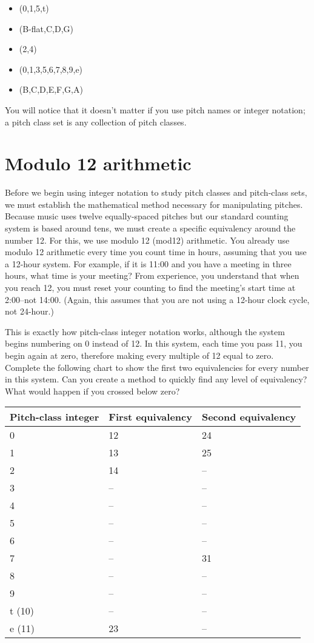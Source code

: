 \documentclass{book}
\providecommand{\tightlist}{%
  \setlength{\itemsep}{0pt}\setlength{\parskip}{0pt}}
\begin{document}
\begin{itemize}
\tightlist
\item
  (0,1,5,t)
\item
  (B-flat,C,D,G)
\item
  (2,4)
\item
  (0,1,3,5,6,7,8,9,e)
\item
  (B,C,D,E,F,G,A)
\end{itemize}

You will notice that it doesn't matter if you use pitch names or integer
notation; a pitch class set is any collection of pitch classes.

\hypertarget{modulo-12-arithmetic}{%
\section{Modulo 12 arithmetic}\label{modulo-12-arithmetic}}

Before we begin using integer notation to study pitch classes and pitch-class
sets, we must establish the mathematical method necessary for manipulating
pitches. Because music uses twelve equally-spaced pitches but our standard
counting system is based around tens, we must create a specific equivalency
around the number 12. For this, we use modulo 12 (mod12) arithmetic. You
already use modulo 12 arithmetic every time you count time in hours, assuming
that you use a 12-hour system. For example, if it is 11:00 and you have a
meeting in three hours, what time is your meeting? From experience, you
understand that when you reach 12, you must reset your counting to find the
meeting's start time at 2:00--not 14:00. (Again, this assumes that you are not
using a 12-hour clock cycle, not 24-hour.)

This is exactly how pitch-class integer notation works, although the system
begins numbering on 0 instead of 12. In this system, each time you pass 11,
you begin again at zero, therefore making every multiple of 12 equal to zero.
Complete the following chart to show the first two equivalencies for every
number in this system. Can you create a method to quickly find any level of
equivalency? What would happen if you crossed below zero?

\begin{longtable}[]{@{}lll@{}}
\toprule
Pitch-class integer & First equivalency & Second equivalency \\
\midrule
\endhead
0 & 12 & 24 \\
1 & 13 & 25 \\
2 & 14 & -- \\
3 & -- & -- \\
4 & -- & -- \\
5 & -- & -- \\
6 & -- & -- \\
7 & -- & 31 \\
8 & -- & -- \\
9 & -- & -- \\
t (10) & -- & -- \\
e (11) & 23 & -- \\
\bottomrule
\end{longtable}
\end{document}
